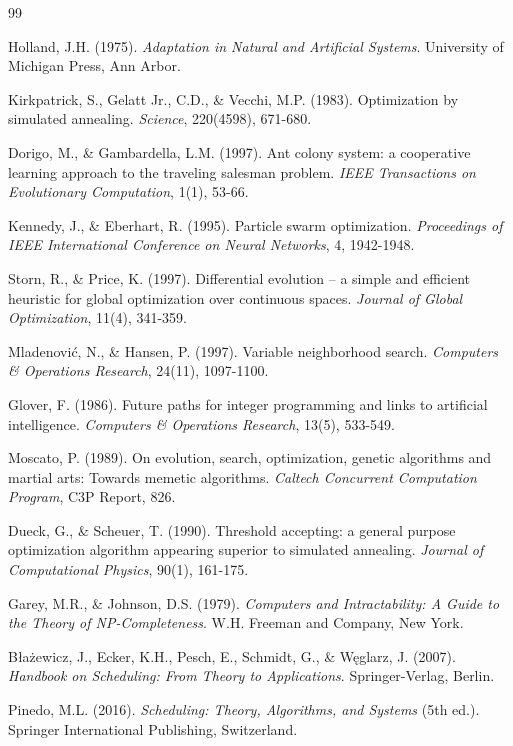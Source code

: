 \documentclass[11pt,a4paper]{article}
\begin{document}
\begin{thebibliography}{99}

Holland, J.H. (1975). \textit{Adaptation in Natural and Artificial Systems}. University of Michigan Press, Ann Arbor.

Kirkpatrick, S., Gelatt Jr., C.D., \& Vecchi, M.P. (1983). Optimization by simulated annealing. \textit{Science}, 220(4598), 671-680.

Dorigo, M., \& Gambardella, L.M. (1997). Ant colony system: a cooperative learning approach to the traveling salesman problem. \textit{IEEE Transactions on Evolutionary Computation}, 1(1), 53-66.

Kennedy, J., \& Eberhart, R. (1995). Particle swarm optimization. \textit{Proceedings of IEEE International Conference on Neural Networks}, 4, 1942-1948.

Storn, R., \& Price, K. (1997). Differential evolution – a simple and efficient heuristic for global optimization over continuous spaces. \textit{Journal of Global Optimization}, 11(4), 341-359.

Mladenović, N., \& Hansen, P. (1997). Variable neighborhood search. \textit{Computers \& Operations Research}, 24(11), 1097-1100.

Glover, F. (1986). Future paths for integer programming and links to artificial intelligence. \textit{Computers \& Operations Research}, 13(5), 533-549.

Moscato, P. (1989). On evolution, search, optimization, genetic algorithms and martial arts: Towards memetic algorithms. \textit{Caltech Concurrent Computation Program}, C3P Report, 826.

Dueck, G., \& Scheuer, T. (1990). Threshold accepting: a general purpose optimization algorithm appearing superior to simulated annealing. \textit{Journal of Computational Physics}, 90(1), 161-175.

Garey, M.R., \& Johnson, D.S. (1979). \textit{Computers and Intractability: A Guide to the Theory of NP-Completeness}. W.H. Freeman and Company, New York.

Błażewicz, J., Ecker, K.H., Pesch, E., Schmidt, G., \& Węglarz, J. (2007). \textit{Handbook on Scheduling: From Theory to Applications}. Springer-Verlag, Berlin.

Pinedo, M.L. (2016). \textit{Scheduling: Theory, Algorithms, and Systems} (5th ed.). Springer International Publishing, Switzerland.

\end{thebibliography}
\end{document}
